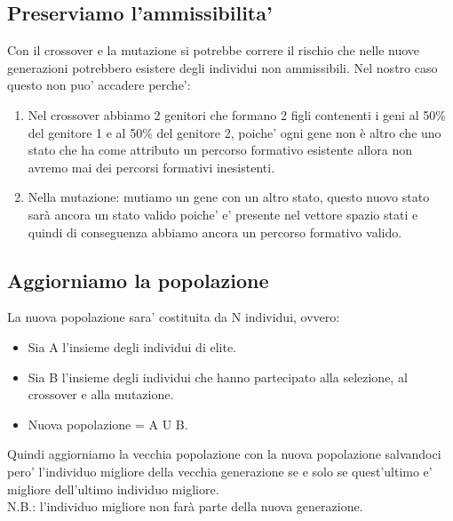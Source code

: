 \documentclass[10pt,a4paper]{article}
\begin{document}
    \subsection{Preserviamo l'ammissibilita'}
    \label{PreserviamoAmmissibilitaSubsection}
    Con il crossover e la mutazione si potrebbe correre il rischio che nelle nuove generazioni 
    potrebbero esistere degli individui non ammissibili. Nel nostro caso questo non puo' accadere perche':
    \begin{enumerate}
      \item Nel crossover abbiamo 2 genitori che formano 2 figli contenenti i geni 
      al 50\% del genitore 1 e al 50\% del genitore 2, poiche' ogni gene non è altro che uno stato che ha come attributo un percorso formativo esistente 
      allora non avremo mai dei percorsi formativi inesistenti.
      \item Nella mutazione: mutiamo un gene con un altro stato, questo nuovo stato sarà ancora un 
      stato valido poiche' e' presente nel vettore spazio stati e quindi di conseguenza abbiamo ancora un percorso formativo valido.
    \end{enumerate}
    
    \subsection{Aggiorniamo la popolazione}
    \label{aggiorniamoPopolazioneSubsection}
    La nuova popolazione sara' costituita da N individui, ovvero:
    \begin{itemize}
      \item Sia A l'insieme degli individui di elite.
      \item Sia B l'insieme degli individui che hanno partecipato alla selezione, al crossover e alla 
      mutazione.
      \item Nuova popolazione = A U B.
    \end{itemize}
    Quindi aggiorniamo la vecchia popolazione con la nuova popolazione salvandoci pero' l'individuo 
    migliore della vecchia generazione se e solo se quest'ultimo e' migliore dell'ultimo individuo 
    migliore.\\
    N.B.: l'individuo migliore non farà parte della nuova generazione.
    
\end{document}
